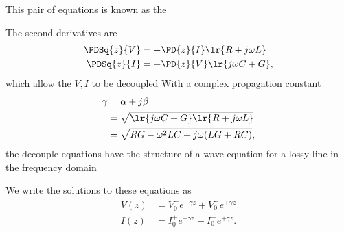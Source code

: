 This pair of equations is known as the 

The second derivatives are
\begin{equation}\label{eqn:uwaves4TransmissionLines:120}
\begin{aligned}
\PDSq{z}{V} &= -\PD{z}{I} \lr{ R + j \omega L } \\
\PDSq{z}{I} &= -\PD{z}{V} \lr{ j \omega C + G},
\end{aligned}
\end{equation}
which allow the \( V, I \) to be decoupled
With a complex propagation constant
\begin{equation}\label{eqn:uwaves4TransmissionLines:160}
\begin{aligned}
\gamma
&= \alpha + j \beta
\\ &= \sqrt{ \lr{ j \omega C + G} \lr{ R + j \omega L } }
\\ &=
\sqrt{ R G - \omega^2 L C + j \omega ( L G + R C ) },
\end{aligned}
\end{equation}
the decouple equations have the structure of a wave equation for a lossy line in the frequency domain

We write the solutions to these equations as
\begin{equation}\label{eqn:uwaves4TransmissionLines:200}
\begin{aligned}
V(z) &= V_0^{+} e^{-\gamma z} + V_0^{-} e^{+\gamma z} \\
I(z) &= I_0^{+} e^{-\gamma z} - I_0^{-} e^{+\gamma z}.
\end{aligned}
\end{equation}

